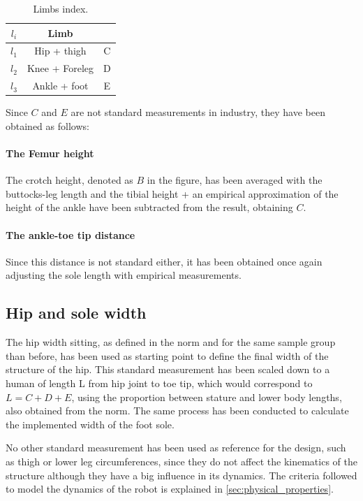 \begin{table}
\begin{center}
	\begin{tabular}{c | c | c}
	  $l_{i}$ & Limb \\
	  \hline
	  $l_{1}$ & Hip + thigh & C \\
	  $l_{2}$ & Knee + Foreleg & D\\
	  $l_{3}$ & Ankle + foot & E 
	\end{tabular}
	\caption{Limbs index.}
	\label{tab:limb_index}
\end{center}
\end{table}

Since $C$ and $E$ are not standard measurements in industry, they have been obtained as follows:

\paragraph{The Femur height}
The crotch height, denoted as $B$ in the figure, has been averaged with the buttocks-leg length and the tibial height + an empirical approximation of the height of the ankle have been subtracted from the result, obtaining $C$.

\paragraph{The ankle-toe tip distance}
Since this distance is not standard either, it has been obtained once again adjusting the sole length with empirical measurements.

\subsection{Hip and sole width} %
\label{sub:subsection_name}
The hip width sitting, as defined in the norm and for the same sample group than before, has been used as starting point to define the final width of the structure of the hip.
This standard measurement has been scaled down to a human of length L from hip joint to toe tip, which would correspond to $L=C+D+E$, using the proportion between stature and lower body lengths, also obtained from the norm.
The same process has been conducted to calculate the implemented width of the foot sole.


No other standard measurement has been used as reference for the design, such as thigh or lower leg circumferences, since they do not affect the kinematics of the structure although they have a big influence in its dynamics.
The criteria followed to model the dynamics of the robot is explained in \ref{sec:physical_properties}.





